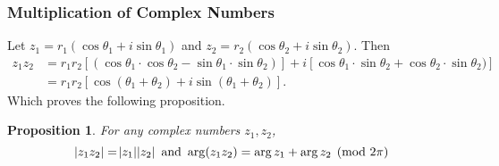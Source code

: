 \documentclass[12pt]{article}
\newtheorem{prop}{Proposition}[theorem]
\theoremstyle{definition}
\begin{document}
\subsubsection{Multiplication of Complex Numbers}
Let $z_1 = r_1(\cos \theta_1 + i \sin \theta_1)$ and $z_2 = r_2(\cos \theta_2 + i \sin \theta_2)$. Then
\begin{align*}
	z_1 z_2 &= r_1 r_2 [(\cos \theta_1 \cdot \cos \theta_2 - \sin \theta_1 \cdot \sin \theta_2)] + i[\cos \theta_1 \cdot \sin \theta_2 + \cos \theta_2 \cdot \sin \theta_2)] \\
		&= r_1 r_2 [\cos(\theta_1+\theta_2)+i \sin(\theta_1 + \theta_2)].
\end{align*}
Which proves the following proposition.
\begin{prop}
For any complex numbers $z_1, z_2$,
\[
	\abs{z_1 z_2} = \abs{z_1} \abs{z_2} \text{ and } \arg(z_1 z_2) = \arg z_1 + \arg z_2 \pmod {2\pi}
\]
\end{prop}
\end{document}
